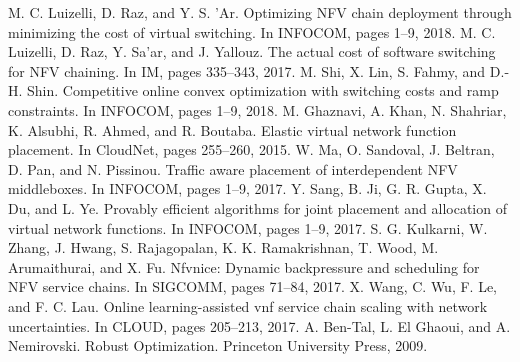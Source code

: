 \documentclass{acmtog}
\begin{document}
\begin{thebibliography}{99}
M. C. Luizelli, D. Raz, and Y. S. ’Ar. Optimizing NFV chain deployment through minimizing the cost of virtual switching. In INFOCOM, pages
1–9, 2018.
M. C. Luizelli, D. Raz, Y. Sa’ar, and J. Yallouz. The actual cost of software switching for NFV chaining. In IM, pages 335–343, 2017.
M. Shi, X. Lin, S. Fahmy, and D.-H. Shin. Competitive online convex optimization with switching costs and ramp constraints. In INFOCOM, pages 1–9, 2018.
M. Ghaznavi, A. Khan, N. Shahriar, K. Alsubhi, R. Ahmed, and
R. Boutaba. Elastic virtual network function placement. In CloudNet, pages 255–260, 2015.
W. Ma, O. Sandoval, J. Beltran, D. Pan, and N. Pissinou. Traffic aware placement of interdependent NFV middleboxes. In INFOCOM, pages 1–9, 2017.
Y. Sang, B. Ji, G. R. Gupta, X. Du, and L. Ye. Provably efficient algorithms for joint placement and allocation of virtual network functions. In INFOCOM, pages 1–9, 2017.
S. G. Kulkarni, W. Zhang, J. Hwang, S. Rajagopalan, K. K. Ramakrishnan, T. Wood, M. Arumaithurai, and X. Fu. Nfvnice: Dynamic backpressure and scheduling for NFV service chains. In SIGCOMM, pages 71–84, 2017.
X. Wang, C. Wu, F. Le, and F. C. Lau. Online learning-assisted vnf service chain scaling with network uncertainties. In CLOUD, pages 205–213, 2017.
A. Ben-Tal, L. El Ghaoui, and A. Nemirovski. Robust Optimization.
Princeton University Press, 2009.
\end{thebibliography}
\end{document}
